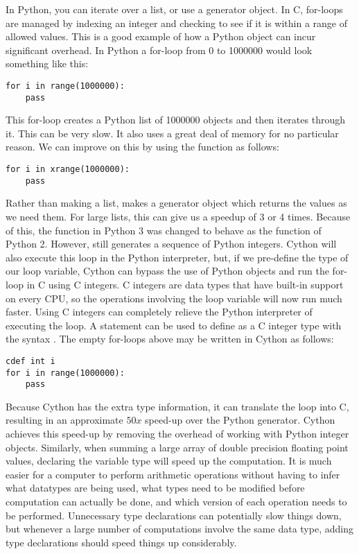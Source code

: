 In Python, you can iterate over a list, or use a generator object.
In C, for-loops are managed by indexing an integer and checking to see if it is within a range of allowed values.
This is a good example of how a Python object can incur significant overhead.
In Python a for-loop from 0 to 1000000 would look something like this:
\begin{lstlisting}
for i in range(1000000):
    pass
\end{lstlisting}
This for-loop creates a Python list of 1000000 objects and then iterates through it.
This can  be very slow.
It also uses a great deal of memory for no particular reason.
We can improve on this by using the  function as follows:
\begin{lstlisting}
for i in xrange(1000000):
    pass
\end{lstlisting}

Rather than making a list,  makes a generator object which returns the values as we need them.
For large lists, this can give us a speedup of 3 or 4 times.
Because of this, the  function in Python 3 was changed to behave as the  function of Python 2.
However,  still generates a sequence of Python integers.
Cython will also execute this loop in the Python interpreter, but, if we pre-define the type of our loop variable, Cython can bypass the use of Python objects and run the for-loop in C using C integers.
C integers are data types that have built-in support on every CPU, so the operations involving the loop variable will now run much faster.
Using C integers can completely relieve the Python interpreter of executing the loop.
A  statement can be used to define  as a C integer type with the syntax .
The empty for-loops above may be written in Cython as follows:
\begin{lstlisting}
cdef int i
for i in range(1000000):
    pass
\end{lstlisting}

Because Cython has the extra type information, it can translate the loop into C, resulting in an approximate $50x$ speed-up over the Python generator.
Cython achieves this speed-up by removing the overhead of working with Python integer objects.
Similarly, when summing a large array of double precision floating point values, declaring the variable type will speed up the computation.
It is much easier for a computer to perform arithmetic operations without having to infer what datatypes are being used, what types need to be modified before computation can actually be done, and which version of each operation needs to be performed.
Unnecessary type declarations can potentially slow things down, but whenever a large number of computations involve the same data type, adding type declarations should speed things up considerably.

